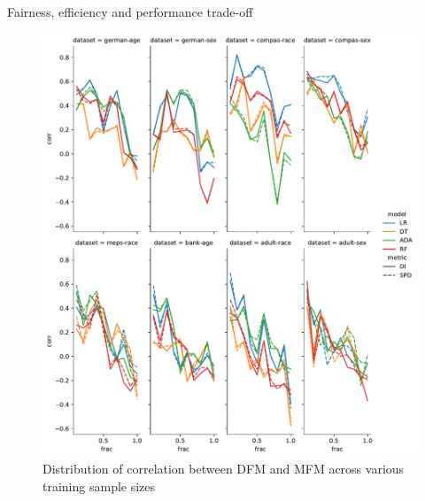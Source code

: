 \documentclass[aspectratio=169]{beamer}
\begin{document}
\begin{frame}{Fairness, efficiency and performance trade-off}
  \begin{figure}
    \centering
    \includegraphics[height=0.7\textheight, keepaspectratio]{lineplot--frac--corr.pdf}
    \caption{Distribution of correlation between DFM and MFM across
      various training sample sizes}
  \end{figure}
\end{frame}
\end{document}
